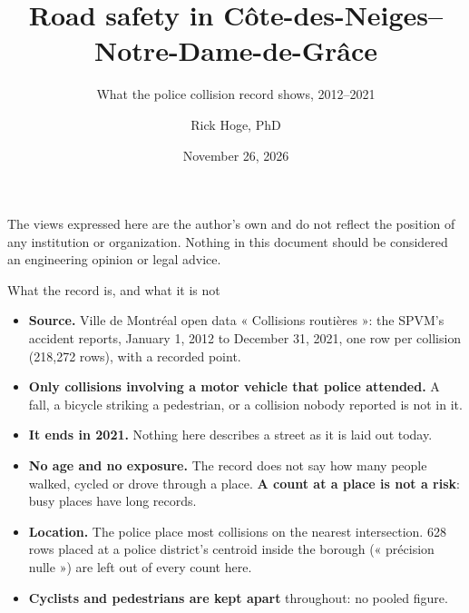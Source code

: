 \documentclass[aspectratio=169,10pt]{beamer}\usetheme{default}\usecolortheme{seahorse}\setbeamertemplate{navigation symbols}{}
\title{Road safety in Côte-des-Neiges--Notre-Dame-de-Grâce}
\subtitle{What the police collision record shows, 2012--2021}
\author{Rick Hoge, PhD}\date{November 26, 2026 \quad {\footnotesize v2026-11-26-12-05-48}}
\begin{document}
\begin{frame}\titlepage
{\footnotesize The views expressed here are the author's own and do not reflect the position of any institution or organization. Nothing in this document should be considered an engineering opinion or legal advice.}
\end{frame}

\begin{frame}{What the record is, and what it is not}
\begin{itemize}\setlength\itemsep{5pt}
\item \textbf{Source.} Ville de Montréal open data « Collisions routières »: the SPVM's accident reports, January 1, 2012 to December 31, 2021, one row per collision (218{,}272 rows), with a recorded point.
\item \textbf{Only collisions involving a motor vehicle that police attended.} A fall, a bicycle striking a pedestrian, or a collision nobody reported is not in it.
\item \textbf{It ends in 2021.} Nothing here describes a street as it is laid out today.
\item \textbf{No age and no exposure.} The record does not say how many people walked, cycled or drove through a place. \textbf{A count at a place is not a risk}: busy places have long records.
\item \textbf{Location.} The police place most collisions on the nearest intersection. 628 rows placed at a police district's centroid inside the borough (« précision nulle ») are left out of every count here.
\item \textbf{Cyclists and pedestrians are kept apart} throughout: no pooled figure.
\end{itemize}
\end{frame}
\end{document}
